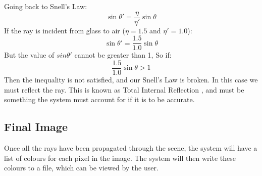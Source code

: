 \documentclass[../main.tex]{subfiles}
\begin{document}
Going back to Snell's Law:
$$
\sin \theta' = \frac{\eta}{\eta'} \sin \theta
$$
If the ray is incident from glass to air ($\eta = 1.5$ and $\eta' = 1.0$):
$$
\sin \theta' = \frac{1.5}{1.0} \sin \theta
$$
But the value of $sin \theta'$ cannot be greater than 1, So if:
$$
\frac{1.5}{1.0} \sin \theta > 1
$$
Then the inequality is not satisfied, and our Snell's Law is broken. 
In this case we must reflect the ray. This is known as Total Internal Reflection \cite{bone_level_2016}, and must 
be something the system must account for if it is to be accurate.

\subsection{Final Image}
Once all the rays have been propagated through the scene, the system will have a list of colours for each pixel in the image.
The system will then write these colours to a file, which can be viewed by the user.
\end{document}
